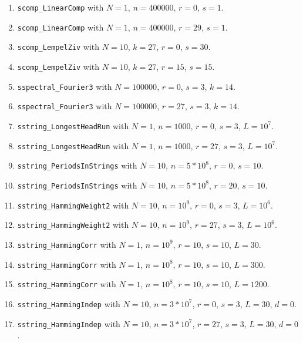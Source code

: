 \begin{enumerate}
  \item {\tt scomp\_LinearComp} with $N=1$, $n=400000$, $r=0$, $s=1$.

  \item {\tt scomp\_LinearComp} with $N=1$, $n=400000$, $r=29$, $s=1$.

  \item {\tt scomp\_LempelZiv} with $N=10$, $k=27$, $r=0$, $s=30$.

  \item {\tt scomp\_LempelZiv} with $N=10$, $k=27$, $r=15$, $s=15$.

  \item {\tt sspectral\_Fourier3} with $N=100000$, $r=0$, $s=3$, $k=14$.

  \item {\tt sspectral\_Fourier3} with $N=100000$, $r=27$, $s=3$, $k=14$.

  \item {\tt sstring\_LongestHeadRun} with $N=1$, $n=1000$, $r=0$,
   $s=3$, $L=10^7$.

  \item {\tt sstring\_LongestHeadRun} with $N=1$, $n=1000$, $r=27$,
   $s=3$, $L=10^7$.

  \item {\tt sstring\_PeriodsInStrings} with $N=10$, $n=5*10^8$, $r=0$,
   $s=10$.

  \item {\tt sstring\_PeriodsInStrings} with $N=10$, $n=5*10^8$, $r=20$,
   $s=10$.

  \item {\tt sstring\_HammingWeight2} with $N=10$, $n=10^9$, $r=0$,
   $s=3$, $L=10^6$.

  \item {\tt sstring\_HammingWeight2} with $N=10$, $n=10^9$, $r=27$,
   $s=3$, $L=10^6$.

  \item {\tt sstring\_HammingCorr} with $N=1$, $n=10^9$, $r=10$,
   $s=10$, $L=30$.

  \item {\tt sstring\_HammingCorr} with $N=1$, $n=10^8$, $r=10$,
   $s=10$, $L=300$.

  \item {\tt sstring\_HammingCorr} with $N=1$, $n=10^8$, $r=10$,
   $s=10$, $L=1200$.

  \item {\tt sstring\_HammingIndep} with $N=10$, $n=3*10^7$, $r=0$,
   $s=3$, $L=30$, $d=0$.

  \item {\tt sstring\_HammingIndep} with $N=10$, $n=3*10^7$, $r=27$,
   $s=3$, $L=30$, $d=0$.


\end{enumerate}
